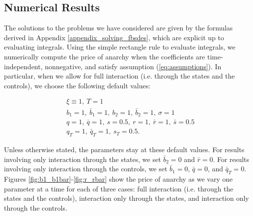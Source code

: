 \documentclass[11pt]{article}
\begin{document}
\subsection{\textbf{Numerical Results}}
The solutions to the problems we have considered are given by the formulas derived in Appendix \ref{appendix_solving_fbsdes}, which are explicit up to evaluating integrals. Using the simple rectangle rule to evaluate integrals, we numerically compute the price of anarchy when the coefficients are time-independent, nonnegative, and satisfy assumption (\ref{eq:assumptions}). In particular, when we allow for full interaction (i.e. through the states and the controls), we choose the following default values:

\begin{equation*}
\begin{split}
    &\xi\equiv 1,\ T=1 \\
    &b_1=1,\  \bar{b}_1=1,\ b_2=1,\ \bar{b}_2=1,\ \sigma=1 \\
    &q=1,\ \bar{q}=1,\ s=0.5,\ r=1,\ \bar{r}=1,\ \bar{s}=0.5 \\
    &q_T=1,\  \bar{q}_T=1,\ s_T=0.5.
\end{split}
\end{equation*}

Unless otherwise stated, the parameters stay at these default values. For results involving only interaction through the states, we set $\bar{b}_2=0$ and $\bar{r}=0$. For results involving only interaction through the controls, we set $\bar{b}_1=0$, $\bar{q}=0$, and $\bar{q}_T=0$. Figures \ref{fig:b1_b1bar}-\ref{fig:r_rbar} show the price of anarchy as we vary one parameter at a time for each of three cases: full interaction (i.e. through the states and the controls), interaction only through the states, and interaction only through the controls.
\end{document}
